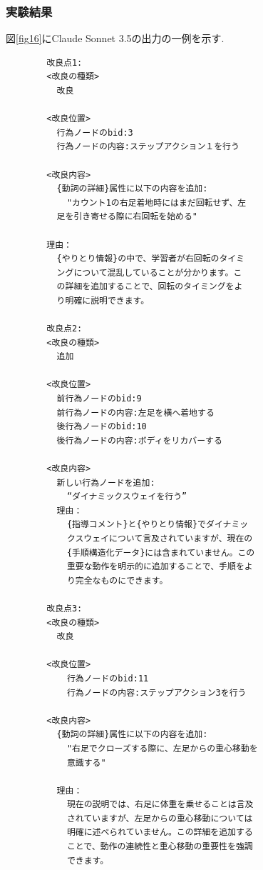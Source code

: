 \subsubsection{実験結果}
図\ref{fig16}にClaude Sonnet 3.5の出力の一例を示す.

\begin{tcolorbox}[breakable, colback=white, colframe=black]
    \begin{verbatim}
        改良点1:
        <改良の種類>
          改良
        
        <改良位置>
          行為ノードのbid:3
          行為ノードの内容:ステップアクション１を行う
        
        <改良内容>
          {動詞の詳細}属性に以下の内容を追加:
            "カウント1の右足着地時にはまだ回転せず、左
          足を引き寄せる際に右回転を始める"
         
        理由：
          {やりとり情報}の中で、学習者が右回転のタイミ
          ングについて混乱していることが分かります。こ
          の詳細を追加することで、回転のタイミングをよ
          り明確に説明できます。
        
        改良点2:
        <改良の種類>
          追加
        
        <改良位置>
          前行為ノードのbid:9
          前行為ノードの内容:左足を横へ着地する
          後行為ノードのbid:10
          後行為ノードの内容:ボディをリカバーする
        
        <改良内容>
          新しい行為ノードを追加:
            “ダイナミックスウェイを行う”
          理由：
            {指導コメント}と{やりとり情報}でダイナミッ
            クスウェイについて言及されていますが、現在の
            {手順構造化データ}には含まれていません。この
            重要な動作を明示的に追加することで、手順をよ
            り完全なものにできます。
        
        改良点3:
        <改良の種類>
          改良
        
        <改良位置>
            行為ノードのbid:11
            行為ノードの内容:ステップアクション3を行う
        
        <改良内容>
          {動詞の詳細}属性に以下の内容を追加:
            "右足でクローズする際に、左足からの重心移動を
            意識する"
         
          理由：
            現在の説明では、右足に体重を乗せることは言及
            されていますが、左足からの重心移動については
            明確に述べられていません。この詳細を追加する
            ことで、動作の連続性と重心移動の重要性を強調
            できます。
    \end{verbatim}
\end{tcolorbox}
    
